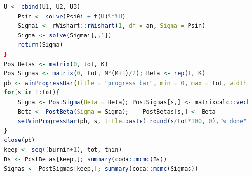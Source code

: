 \begin{enumerate}[leftmargin=*]
\begin{tcolorbox}[enhanced,width=4.67in,center upper,
	fontupper=\large\bfseries,drop shadow southwest,sharp corners]
\begin{VF}
\begin{lstlisting}[language=R]
	U <- cbind(U1, U2, U3)
	Psin <- solve(Psi0i + t(U)%*%U)
	Sigmai <- rWishart::rWishart(1, df = an, Sigma = Psin)
	Sigma <- solve(Sigmai[,,1]) 
	return(Sigma)
}
PostBetas <- matrix(0, tot, K)
PostSigmas <- matrix(0, tot, M*(M+1)/2); Beta <- rep(1, K)
pb <- winProgressBar(title = "progress bar", min = 0, max = tot, width = 300)
for(s in 1:tot){
	Sigma <- PostSigma(Beta = Beta); PostSigmas[s,] <- matrixcalc::vech(Sigma)
	Beta <- PostBeta(Sigma = Sigma); 	PostBetas[s,] <- Beta
	setWinProgressBar(pb, s, title=paste( round(s/tot*100, 0),"% done"))
}
close(pb)
keep <- seq((burnin+1), tot, thin)
Bs <- PostBetas[keep,]; summary(coda::mcmc(Bs))
Sigmas <- PostSigmas[keep,]; summary(coda::mcmc(Sigmas))
\end{lstlisting}
	\end{VF}
\end{tcolorbox} 


\end{enumerate}
